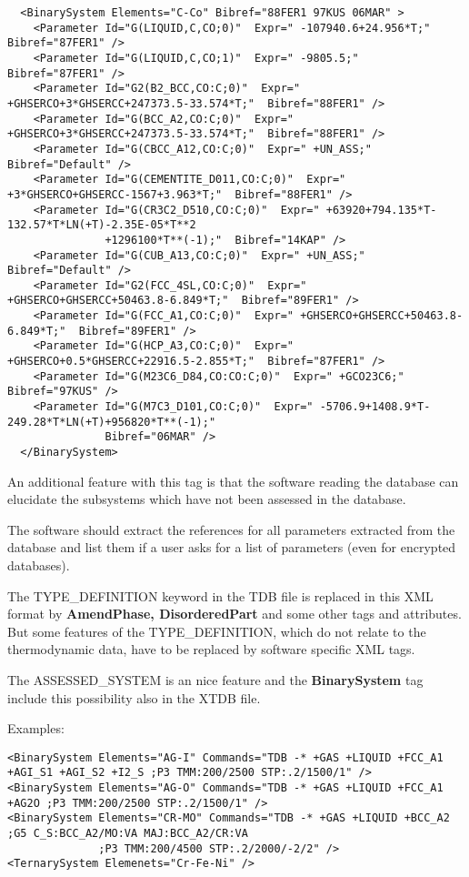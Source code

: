 \documentclass{article}
\begin{document}
{\begin{verbatim}
  <BinarySystem Elements="C-Co" Bibref="88FER1 97KUS 06MAR" >
    <Parameter Id="G(LIQUID,C,CO;0)"  Expr=" -107940.6+24.956*T;"  Bibref="87FER1" />
    <Parameter Id="G(LIQUID,C,CO;1)"  Expr=" -9805.5;"  Bibref="87FER1" />
    <Parameter Id="G2(B2_BCC,CO:C;0)"  Expr=" +GHSERCO+3*GHSERCC+247373.5-33.574*T;"  Bibref="88FER1" />
    <Parameter Id="G(BCC_A2,CO:C;0)"  Expr=" +GHSERCO+3*GHSERCC+247373.5-33.574*T;"  Bibref="88FER1" />
    <Parameter Id="G(CBCC_A12,CO:C;0)"  Expr=" +UN_ASS;"  Bibref="Default" />
    <Parameter Id="G(CEMENTITE_D011,CO:C;0)"  Expr=" +3*GHSERCO+GHSERCC-1567+3.963*T;"  Bibref="88FER1" />
    <Parameter Id="G(CR3C2_D510,CO:C;0)"  Expr=" +63920+794.135*T-132.57*T*LN(+T)-2.35E-05*T**2
               +1296100*T**(-1);"  Bibref="14KAP" />
    <Parameter Id="G(CUB_A13,CO:C;0)"  Expr=" +UN_ASS;"  Bibref="Default" />
    <Parameter Id="G2(FCC_4SL,CO:C;0)"  Expr=" +GHSERCO+GHSERCC+50463.8-6.849*T;"  Bibref="89FER1" />
    <Parameter Id="G(FCC_A1,CO:C;0)"  Expr=" +GHSERCO+GHSERCC+50463.8-6.849*T;"  Bibref="89FER1" />
    <Parameter Id="G(HCP_A3,CO:C;0)"  Expr=" +GHSERCO+0.5*GHSERCC+22916.5-2.855*T;"  Bibref="87FER1" />
    <Parameter Id="G(M23C6_D84,CO:CO:C;0)"  Expr=" +GCO23C6;"  Bibref="97KUS" />
    <Parameter Id="G(M7C3_D101,CO:C;0)"  Expr=" -5706.9+1408.9*T-249.28*T*LN(+T)+956820*T**(-1);"
               Bibref="06MAR" />
  </BinarySystem>
\end{verbatim}
}

An additional feature with this tag is that the software reading the
database can elucidate the subsystems which have not been assessed in
the database.

The software should extract the references for all parameters
extracted from the database and list them if a user asks for a list of
parameters (even for encrypted databases).

\bigskip
The TYPE\_DEFINITION keyword in the TDB file is replaced in this XML
format by {\bf AmendPhase, DisorderedPart} and some other tags and
attributes.  But some features of the TYPE\_DEFINITION, which do not
relate to the thermodynamic data, have to be replaced by software
specific XML tags.

The ASSESSED\_SYSTEM is an nice feature and the {\bf BinarySystem} tag
include this possibility also in the XTDB file.

Examples:

{\small
\begin{verbatim}
<BinarySystem Elements="AG-I" Commands="TDB -* +GAS +LIQUID +FCC_A1 +AGI_S1 +AGI_S2 +I2_S ;P3 TMM:200/2500 STP:.2/1500/1" />
<BinarySystem Elements="AG-O" Commands="TDB -* +GAS +LIQUID +FCC_A1 +AG2O ;P3 TMM:200/2500 STP:.2/1500/1" />
<BinarySystem Elements="CR-MO" Commands="TDB -* +GAS +LIQUID +BCC_A2 ;G5 C_S:BCC_A2/MO:VA MAJ:BCC_A2/CR:VA   
              ;P3 TMM:200/4500 STP:.2/2000/-2/2" />
<TernarySystem Elemenets="Cr-Fe-Ni" />
\end{verbatim}
}
\end{document}
